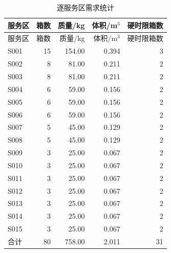 \begin{longtable}{lrrrr}
\caption{逐服务区需求统计}\label{tab:demand-details}\\
\toprule 服务区 & 箱数 & 质量/kg & 体积/m$^3$ & 硬时限箱数\\\midrule\endfirsthead
\toprule 服务区 & 箱数 & 质量/kg & 体积/m$^3$ & 硬时限箱数\\\midrule\endhead
S001 & 15 & 154.00 & 0.394 & 3 \\
S002 & 8 & 81.00 & 0.211 & 2 \\
S003 & 8 & 81.00 & 0.211 & 2 \\
S004 & 6 & 59.00 & 0.156 & 2 \\
S005 & 6 & 59.00 & 0.156 & 2 \\
S006 & 6 & 59.00 & 0.156 & 2 \\
S007 & 5 & 45.00 & 0.129 & 2 \\
S008 & 5 & 45.00 & 0.129 & 2 \\
S009 & 3 & 25.00 & 0.067 & 2 \\
S010 & 3 & 25.00 & 0.067 & 2 \\
S011 & 3 & 25.00 & 0.067 & 2 \\
S012 & 3 & 25.00 & 0.067 & 2 \\
S013 & 3 & 25.00 & 0.067 & 2 \\
S014 & 3 & 25.00 & 0.067 & 2 \\
S015 & 3 & 25.00 & 0.067 & 2 \\
合计 & 80 & 758.00 & 2.011 & 31 \\
\bottomrule\end{longtable}
